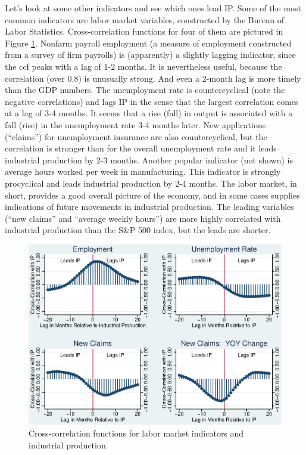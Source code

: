 \documentclass[letterpaper,12pt]{article}
\begin{document}
Let's look at some other indicators and see which ones lead IP.
Some of the most common indicators are labor market variables,
constructed by the Bureau of Labor Statistics.
Cross-correlation functions for four of them are pictured in
Figure \ref{fig:ccf-labor}.
Nonfarm payroll employment (a measure of employment constructed
from a survey of firm payrolls) is (apparently) a slightly
lagging indicator, since the ccf peaks with a lag of 1-2 months.
It is nevertheless useful, because the correlation (over 0.8) is
unusually strong.
And even a 2-month lag is more timely than the GDP numbers.
The unemployment rate is countercyclical (note the negative correlations)
and lags IP in the sense that the largest correlation comes at a
lag of 3-4 months.
It seems that a rise (fall) in output is associated with a fall (rise)
in the unemployment rate 3-4 months later.
New applications (``claims'') for unemployment insurance  are also
countercyclical, but the correlation is stronger than for
the overall unemployment rate and it leads
industrial production by 2-3 months.
Another popular indicator (not shown)
is average hours worked per week in manufacturing.
This indicator is strongly procyclical and leads industrial production
by 2-4 months.
The labor market, in short, provides a good overall picture of the
economy, and in some cases supplies indications of future movements
in industrial production.
The leading variables (``new claims'' and ``average weekly hours'')
are more highly correlated with industrial production
than the S\&P 500 index, but the leads are shorter.

\begin{figure}
    \centering
    \includegraphics[scale=0.8]{xclabor.eps}
    \caption{Cross-correlation functions for
    labor market indicators and industrial production.}
    \label{fig:ccf-labor}%
\end{figure}
\end{document}
